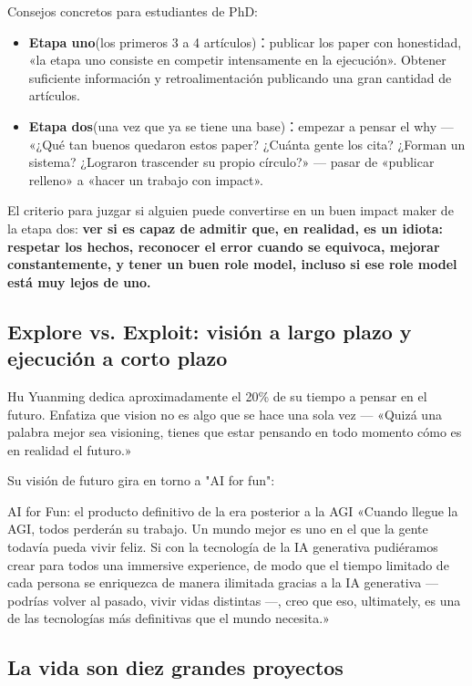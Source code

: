 Consejos concretos para estudiantes de PhD:
\begin{itemize}
\item \textbf{Etapa uno}(los primeros 3 a 4 artículos)：publicar los paper con honestidad, «la etapa uno consiste en competir intensamente en la ejecución». Obtener suficiente información y retroalimentación publicando una gran cantidad de artículos.
\item \textbf{Etapa dos}(una vez que ya se tiene una base)：empezar a pensar el why — «¿Qué tan buenos quedaron estos paper? ¿Cuánta gente los cita? ¿Forman un sistema? ¿Lograron trascender su propio círculo?» — pasar de «publicar relleno» a «hacer un trabajo con impact».
\end{itemize}

El criterio para juzgar si alguien puede convertirse en un buen impact maker de la etapa dos: \textbf{ver si es capaz de admitir que, en realidad, es un idiota: respetar los hechos, reconocer el error cuando se equivoca, mejorar constantemente, y tener un buen role model, incluso si ese role model está muy lejos de uno.}

\subsection{Explore vs. Exploit: visión a largo plazo y ejecución a corto plazo}

Hu Yuanming dedica aproximadamente el 20\% de su tiempo a pensar en el futuro. Enfatiza que vision no es algo que se hace una sola vez — «Quizá una palabra mejor sea visioning, tienes que estar pensando en todo momento cómo es en realidad el futuro.»

Su visión de futuro gira en torno a "AI for fun":

\begin{knowledgebox}{AI for Fun: el producto definitivo de la era posterior a la AGI}
«Cuando llegue la AGI, todos perderán su trabajo. Un mundo mejor es uno en el que la gente todavía pueda vivir feliz. Si con la tecnología de la IA generativa pudiéramos crear para todos una immersive experience, de modo que el tiempo limitado de cada persona se enriquezca de manera ilimitada gracias a la IA generativa — podrías volver al pasado, vivir vidas distintas —, creo que eso, ultimately, es una de las tecnologías más definitivas que el mundo necesita.»
\end{knowledgebox}

\subsection{La vida son diez grandes proyectos}

